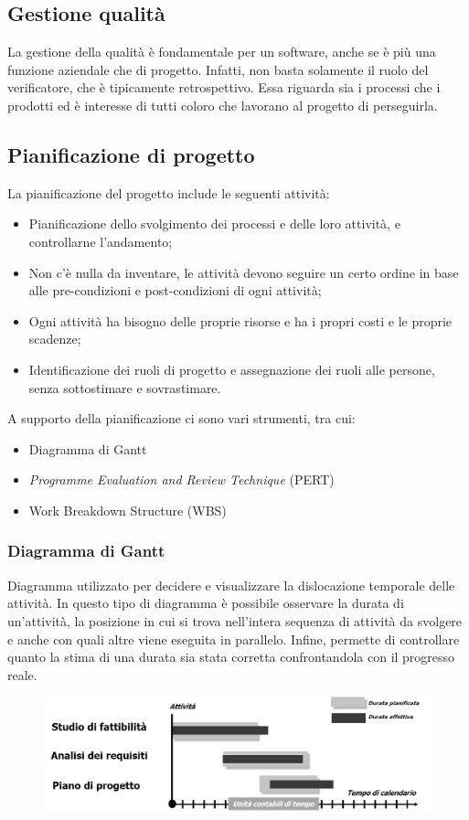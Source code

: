 \documentclass[../main]{subfiles}
\begin{document}
\subsection{Gestione qualità}
La gestione della qualità è fondamentale per un  software, anche se è più una funzione aziendale che di progetto. Infatti, non basta solamente il ruolo del verificatore, che è tipicamente retrospettivo.\newline
Essa riguarda sia i processi che i prodotti ed è interesse di tutti coloro che lavorano al progetto di perseguirla.
\subsection{Pianificazione di progetto}
La pianificazione del progetto include le seguenti attività:
\begin{itemize}
    \item Pianificazione dello svolgimento dei processi e delle loro attività, e controllarne l'andamento;
    \item Non c'è nulla da inventare, le attività devono seguire un certo ordine in base alle pre-condizioni e post-condizioni di ogni attività;
    \item Ogni attività ha bisogno delle proprie risorse e ha i propri costi e le proprie scadenze;
    \item Identificazione dei ruoli di progetto e assegnazione dei ruoli alle persone, senza sottostimare e sovrastimare.
\end{itemize}
A supporto della pianificazione ci sono vari strumenti, tra cui:
\begin{itemize}
    \item Diagramma di Gantt
    \item \textit{Programme Evaluation and Review Technique} (PERT)
    \item Work Breakdown Structure (WBS)
\end{itemize}
\subsubsection{Diagramma di Gantt}
Diagramma utilizzato per decidere e visualizzare la dislocazione temporale delle attività. In questo tipo di diagramma è possibile osservare la durata di un'attività, la posizione in cui si trova nell'intera sequenza di attività da svolgere e anche con quali altre viene eseguita in parallelo. Infine, permette di controllare quanto la stima di una durata sia stata corretta confrontandola con il progresso reale.
\begin{figure}[h]
    \begin{center}
        \includegraphics[scale=0.5]{immagini/gantt.jpg}
    \end{center}
\end{figure}
\end{document}
